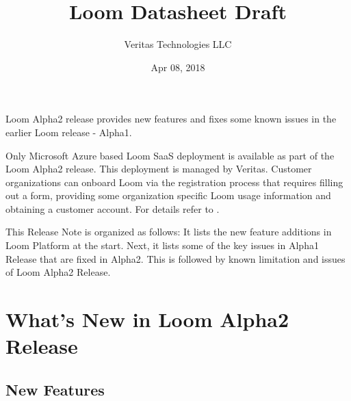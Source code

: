 \documentclass[letterpaper,10pt,english]{sphinxhowto}
\title{Loom Datasheet Draft}
\date{Apr 08, 2018}
\author{Veritas Technologies LLC}
\begin{document}
\maketitle
\sphinxtableofcontents
{}\label{\detokenize{relnotes/rn-loom-alpha2::doc}}


Loom Alpha2 release provides new features and fixes some known issues in the earlier Loom release - Alpha1.

Only Microsoft Azure based Loom SaaS deployment is available as part of the Loom Alpha2 release. This deployment is managed by Veritas.   Customer organizations can onboard Loom via the registration process that requires filling out a form, providing some organization specific Loom usage information and obtaining a customer account. For details refer to .

This Release Note is organized as follows: It lists the new feature additions in Loom Platform at the start.  Next, it lists some of the key issues in Alpha1 Release that are fixed in Alpha2. This is followed by known limitation and issues of Loom Alpha2 Release.


\section{What’s New in Loom Alpha2 Release}
\label{\detokenize{relnotes/rn-loom-alpha2:what-s-new-in-loom-alpha2-release}}\label{\detokenize{relnotes/rn-loom-alpha2:content-rn-loom-alpha2}}\label{\detokenize{relnotes/rn-loom-alpha2:release-notes-loom-alpha2}}\label{\detokenize{relnotes/rn-loom-alpha2:content-rn-loom-common}}

\subsection{New Features}
\label{\detokenize{relnotes/rn-loom-alpha2:new-features}}
\end{document}
